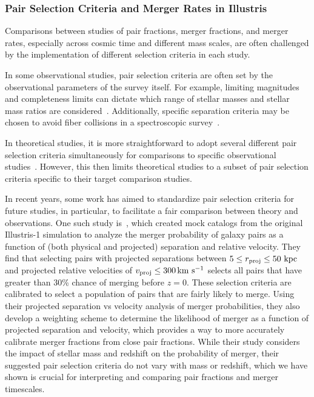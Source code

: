 \documentclass[twocolumn,linenumbers]{aastex631}
\begin{document}
        \subsubsection{Pair Selection Criteria and Merger Rates in Illustris}
            Comparisons between studies of pair fractions, merger fractions, and merger rates, especially across cosmic time and different mass scales, are often challenged by the implementation of different selection criteria in each study.
            
            In some observational studies, pair selection criteria are often set by the observational parameters of the survey itself. 
            For example, limiting magnitudes and completeness limits can dictate which range of stellar masses and stellar mass ratios are considered~\citep{Patton2000,Lotz2008,Man2016,Ventou2019}. Additionally, specific separation criteria may be chosen to avoid fiber collisions in a spectroscopic survey~\citep[as in][]{Patton2011,Besla2018}.
        
            In theoretical studies, it is more straightforward to adopt several different pair selection criteria simultaneously for comparisons to specific observational studies~\citep[i.e.][]{Lotz2011,RG2015,Besla2018,Snyder2023}. 
            However, this then limits theoretical studies to a subset of pair selection criteria specific to their target comparison studies.
    
            In recent years, some work has aimed to standardize pair selection criteria for future studies, in particular, to facilitate a fair comparison between theory and observations. 
            One such study is~\citet{Ventou2019}, which created mock catalogs from the original Illustris-1 simulation to analyze the merger probability of galaxy pairs as a function of (both physical and projected) separation and relative velocity. 
            They find that selecting pairs with projected separations between $5\leq r_{\rm proj} \leq 50\,\mathrm{\,kpc}$ and projected relative velocities of $v_{\rm proj}\leq300\,\mathrm{km}~\mathrm{s}^{-1}$ selects all pairs that have greater than 30\% chance of merging before $z=0$. 
            These selection criteria are calibrated to select a population of pairs that are fairly likely to merge.
            Using their projected separation vs velocity analysis of merger probabilities, they also develop a weighting scheme to determine the likelihood of merger as a function of projected separation and velocity, which provides a way to more accurately calibrate merger fractions from close pair fractions. 
            While their study considers the impact of stellar mass and redshift on the probability of merger, their suggested pair selection criteria do not vary with mass or redshift, which we have shown is crucial for interpreting and comparing pair fractions and merger timescales. 
\end{document}
